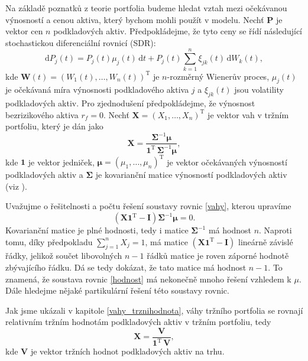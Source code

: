 \documentclass[a4paper,12pt]{report}
\theoremstyle{definition} \newtheorem{definice}[veta]{Definice}
\theoremstyle{remark}
\begin{document}
Na základě poznatků z teorie portfolia budeme hledat vztah mezi očekávanou výnosností a cenou aktiva, který bychom mohli použít v modelu.
Nechť $\boldsymbol{P}$ je vektor cen $n$ podkladových aktiv.
Předpokládejme, že tyto ceny se řídí následující stochastickou diferenciální rovnicí (SDR):
\begin{equation} \label{SDE}
\mathrm{d}P_j(t)=P_j(t)\mu_j(t)\,\mathrm{d}t+P_j(t)\sum_{k=1}^{n}\xi_{jk}(t)\,\mathrm{d}W_k(t),
\end{equation}
kde $\boldsymbol{W}(t)=(W_1(t),\dots,W_n(t))^\mathrm{T}$ je $n$-rozměrný Wienerův proces, $\mu_j(t)$ je očekávaná míra výnosnosti podkladového aktiva $j$ a $\xi_{jk}(t)$ jsou volatility podkladových aktiv. 
Pro zjednodušení předpokládejme, že výnosnost bezrizikového aktiva $r_f=0$.
Nechť $\boldsymbol{X}=(X_1,\dots,X_n)^\mathrm{T}$ je vektor vah v tržním portfoliu, který je dán jako
\begin{equation} \label{vahy}
\boldsymbol{X}=\frac{\boldsymbol{\Sigma}^{-1}\boldsymbol{\mu}}{\boldsymbol{1}^\mathrm{T}\,\boldsymbol{\Sigma}^{-1}\boldsymbol{\mu}},
\end{equation}
kde $\boldsymbol{1}$ je vektor jedniček, $\boldsymbol{\mu}=(\mu_1,\dots,\mu_n)^\mathrm{T}$ je vektor očekávaných výnosností podkladových aktiv a $\boldsymbol{\Sigma}$ je kovarianční matice výnosností podkladových aktiv (viz \cite{fabozzi}).

Uvažujme o řešitelnosti a počtu řešení soustavy rovnic \eqref{vahy}, kterou upravíme
\begin{equation} \label{hodnost}
\left(\boldsymbol{X}\boldsymbol{1}^\mathrm{T}-\mathbf{I}\right)\boldsymbol{\Sigma}^{-1}\boldsymbol{\mu}=0.
\end{equation}
Kovarianční matice je plné hodnosti, tedy i matice $\boldsymbol{\Sigma}^{-1}$ má hodnost $n$.
Naproti tomu, díky předpokladu $\sum_{j=1}^nX_j=1$, má matice $\left(\boldsymbol{X}\boldsymbol{1}^\mathrm{T}-\mathbf{I}\right)$ lineárně závislé řádky, jelikož
součet libovolných $n-1$ řádků matice  je roven záporné hodnotě zbývajícího řádku.
Dá se tedy dokázat, že tato matice má hodnost $n-1$.
To znamená, že soustava rovnic \eqref{hodnost} má nekonečně mnoho řešení vzhledem k $\mu$.
Dále hledejme nějaké partikulární řešení této soustavy rovnic.

Jak jsme ukázali v kapitole \ref{vahy_trznihodnota}, váhy tržního portfolia se rovnají relativním tržním hodnotám podkladových aktiv v tržním portfoliu, tedy
\begin{equation} \label{market_value}
\boldsymbol{X}=\frac{\boldsymbol{V}}{\boldsymbol{1}^\mathrm{T}\,\boldsymbol{V}},
\end{equation}
kde $\boldsymbol{V}$ je vektor tržních hodnot podkladových aktiv na trhu.
\end{document}
